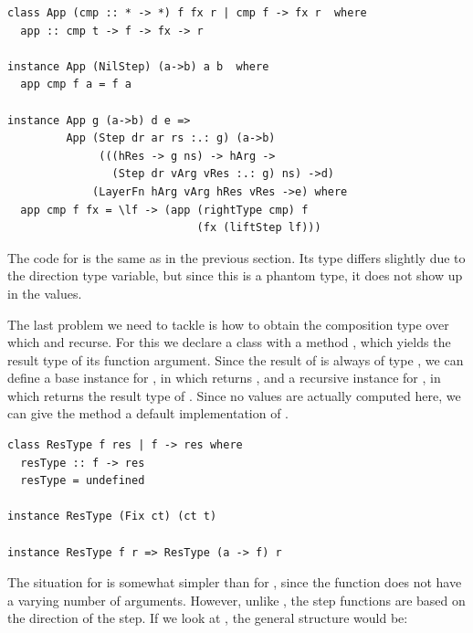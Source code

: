 \documentclass{llncs}
\begin{document}
\begin{small}
\begin{verbatim}
class App (cmp :: * -> *) f fx r | cmp f -> fx r  where
  app :: cmp t -> f -> fx -> r

instance App (NilStep) (a->b) a b  where
  app cmp f a = f a

instance App g (a->b) d e =>
         App (Step dr ar rs :.: g) (a->b) 
              (((hRes -> g ns) -> hArg -> 
                (Step dr vArg vRes :.: g) ns) ->d) 
             (LayerFn hArg vArg hRes vRes ->e) where
  app cmp f fx = \lf -> (app (rightType cmp) f
                             (fx (liftStep lf))) 
\end{verbatim}
\end{small}

The code for  is the same as in the previous section. Its type differs slightly due to the direction type variable, but since this is a phantom type, it does not show up in the values. 

The last problem we need to tackle is how to obtain the composition type over which  and  recurse. For this we declare a class  with a method , which yields the result type of its function argument. Since the result of  is always of type , we can define a base instance for , in which  returns , and a recursive instance for , in which  returns the result type of . Since no values are actually computed here, we can give the method a default implementation of .


\begin{small}
\begin{verbatim}
class ResType f res | f -> res where
  resType :: f -> res
  resType = undefined

instance ResType (Fix ct) (ct t)
  
instance ResType f r => ResType (a -> f) r
\end{verbatim}
\end{small}




The situation for  is somewhat simpler than for , since the function does not have a varying number of arguments. However, unlike , the step functions are based on the direction of the step. If we look at , the general structure would be:
\end{document}
